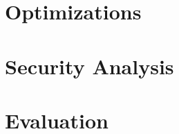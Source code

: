 \documentclass[11pt]{article}
\newcommand{\indcpad}{\mbox{IND-CPA\textsuperscript{D}}}
\begin{document}
\section{Optimizations}
\label{sec:opt}

\section{Security Analysis}
\label{sec:security}

\section{Evaluation}
\label{sec:eval}
\end{document}
